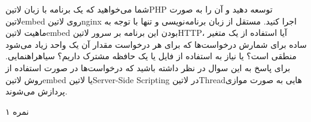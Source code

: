 \documentclass[../main.tex]{subfiles}
\begin{document}

شما می‌خواهید که یک برنامه با زبان ‌لاتین{PHP} توسعه دهید و آن را به صورت ‌لاتین{embed} روی ‌لاتین{nginx} اجرا کنید.
مستقل از زبان برنامه‌نویسی و تنها با توجه به ماهیت ‌لاتین{embed} بودن این برنامه بر سرور ‌لاتین{HTTP}، آیا استفاده از یک متغیر ساده برای شمارش درخواست‌ها
که برای هر درخواست مقدار آن یک واحد زیاد می‌شود منطقی است؟ یا نیاز به استفاده از فایل یا یک حافظه مشترک داریم؟
‌سیاه{راهنمایی.} برای پاسخ به این سوال در نظر داشته باشید که درخواست‌ها در صورت استفاده از روش ‌لاتین{embed} یا ‌لاتین{Server-Side Scripting}
در ‌لاتین{Thread}هایی به صورت موازی پردازش می‌شوند.

۱ نمره
\end{document}
